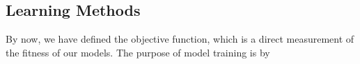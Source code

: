 \subsection {Learning Methods}
By now, we have defined the objective function, which is a direct measurement of the fitness of our models. The purpose of model training is by 